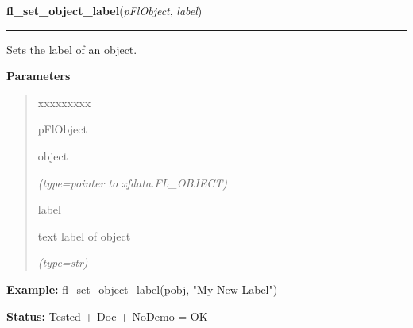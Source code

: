     \vspace{0.5ex}

\hspace{.8\funcindent}\begin{boxedminipage}{\funcwidth}

    \raggedright \textbf{fl\_set\_object\_label}(\textit{pFlObject}, \textit{label})

    \vspace{-1.5ex}

    \rule{\textwidth}{0.5\fboxrule}
\setlength{\parskip}{2ex}
    Sets the label of an object.

\setlength{\parskip}{1ex}
      \textbf{Parameters}
      \vspace{-1ex}

      \begin{quote}
        \begin{Ventry}{xxxxxxxxx}

          \item[pFlObject]

          object

            {\it (type=pointer to xfdata.FL\_OBJECT)}

          \item[label]

          text label of object

            {\it (type=str)}

        \end{Ventry}

      \end{quote}

\textbf{Example:} fl\_set\_object\_label(pobj, "My New Label")



\textbf{Status:} Tested + Doc + NoDemo = OK



    \end{boxedminipage}

    \label{xformslib:flbasic:fl_get_object_label}

    \vspace{0.5ex}

